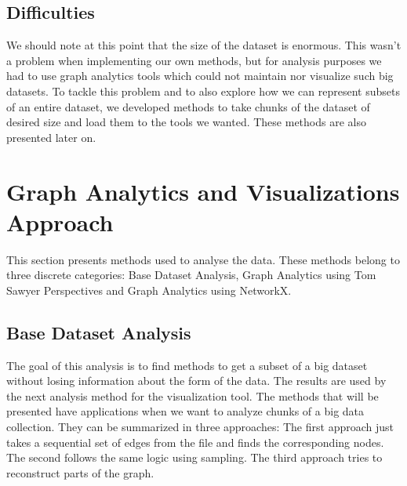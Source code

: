 \documentclass[sigconf, nonacm]{acmart}
\begin{document}
\subsection{Difficulties}
We should note at this point that the size of the dataset is enormous. This wasn't a problem when implementing our own methods, but for analysis purposes we had to use graph analytics tools which could not maintain nor visualize such big datasets. To tackle this problem and to also explore how we can represent subsets of an entire dataset, we developed methods to take chunks of the dataset of desired size and load them to the tools we wanted. These methods are also presented later on.
\section{Graph Analytics and Visualizations Approach}
This section presents methods used to analyse the data. These methods belong to three discrete categories: Base Dataset Analysis, Graph Analytics using Tom Sawyer Perspectives and Graph Analytics using NetworkX.

\subsection{Base Dataset Analysis}
The goal of this analysis is to find methods to get a subset of a big dataset without losing information about the form of the data. The results are used by the next analysis method for the visualization tool. The methods that will be presented have applications when we want to analyze chunks of a big data collection. They can be summarized in three approaches: The first approach just takes a sequential set of edges from the file and finds the corresponding nodes. The second follows the same logic using sampling. The third approach tries to reconstruct parts of the graph.
\end{document}
